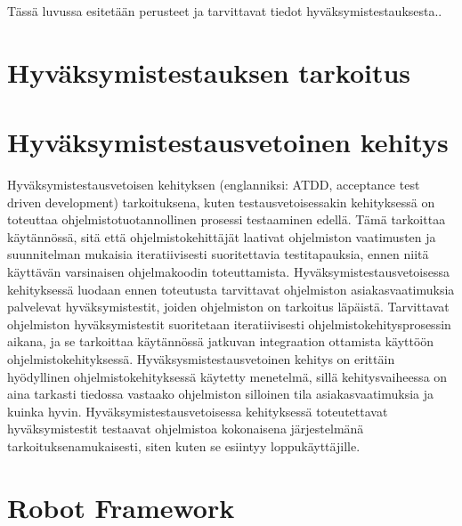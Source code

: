 Tässä luvussa esitetään perusteet ja tarvittavat tiedot hyväksymistestauksesta..

\section{Hyväksymistestauksen tarkoitus} \label{ch:08_hyvaksymistestauksen_tarkoitus}




\section{Hyväksymistestausvetoinen kehitys} \label{ch:08_hyvaksymistestausvetoinen_kehitys}

  Hyväksymistestausvetoisen kehityksen (englanniksi: ATDD, acceptance test driven development) tarkoituksena, kuten testausvetoisessakin kehityksessä on toteuttaa ohjelmistotuotannollinen prosessi testaaminen edellä.
  Tämä tarkoittaa käytännössä, sitä että ohjelmistokehittäjät laativat ohjelmiston vaatimusten ja suunnitelman mukaisia iteratiivisesti suoritettavia testitapauksia, ennen niitä käyttävän varsinaisen ohjelmakoodin toteuttamista.
  Hyväksymistestausvetoisessa kehityksessä luodaan ennen toteutusta tarvittavat ohjelmiston asiakasvaatimuksia palvelevat hyväksymistestit, joiden ohjelmiston on tarkoitus läpäistä.
  Tarvittavat ohjelmiston hyväksymistestit suoritetaan iteratiivisesti ohjelmistokehitysprosessin aikana, ja se tarkoittaa käytännössä jatkuvan integraation ottamista käyttöön ohjelmistokehityksessä.
  Hyväksysmistestausvetoinen kehitys on erittäin hyödyllinen ohjelmistokehityksessä käytetty menetelmä, sillä kehitysvaiheessa on aina tarkasti tiedossa vastaako ohjelmiston silloinen tila asiakasvaatimuksia ja kuinka hyvin.
  Hyväksymistestausvetoisessa kehityksessä toteutettavat hyväksymistestit testaavat ohjelmistoa kokonaisena järjestelmänä tarkoituksenamukaisesti, siten kuten se esiintyy loppukäyttäjille.

\section{Robot Framework} \label{ch:08_robot_framework}

